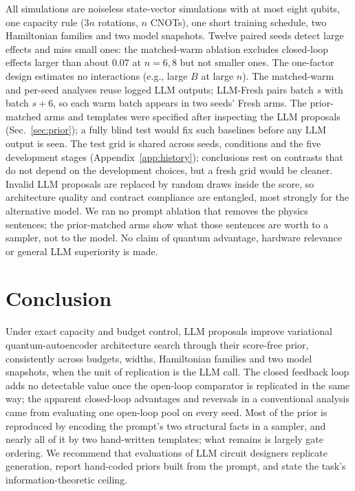 \documentclass[11pt]{article}
\begin{document}
All simulations are noiseless state-vector simulations with at most eight qubits, one
capacity rule ($3n$ rotations, $n$ CNOTs), one short training schedule, two Hamiltonian
families and two model snapshots. Twelve paired seeds detect large effects and miss
small ones: the matched-warm ablation excludes closed-loop effects larger than about
$0.07$ at $n=6,8$ but not smaller ones.
The one-factor design estimates no interactions (e.g., large $B$ at large $n$).
The matched-warm and per-seed analyses reuse logged LLM outputs; LLM-Fresh pairs batch
$s$ with batch $s+6$, so each warm batch appears in two seeds' Fresh arms.
The prior-matched arms and templates were specified after inspecting the LLM
proposals (Sec.~\ref{sec:prior}); a fully blind test would fix such baselines before
any LLM output is seen.
The test grid is shared across seeds, conditions and the five development stages
(Appendix~\ref{app:history}); conclusions rest on contrasts that do not depend on the
development choices, but a fresh grid would be cleaner.
Invalid LLM proposals are replaced by random draws inside the score, so architecture
quality and contract compliance are entangled, most strongly for the alternative model.
We ran no prompt ablation that removes the physics sentences; the prior-matched arms
show what those sentences are worth to a sampler, not to the model.
No claim of quantum advantage, hardware relevance or general LLM superiority is made.

\section{Conclusion}

Under exact capacity and budget control, LLM proposals improve variational
quantum-autoencoder architecture search through their score-free prior, consistently
across budgets, widths, Hamiltonian families and two model snapshots, when the unit of
replication is the LLM call. The closed feedback loop adds no detectable value once the
open-loop comparator is replicated in the same way; the apparent closed-loop advantages
and reversals in a conventional analysis came from evaluating one open-loop pool on
every seed. Most of the prior is reproduced by encoding the prompt's two structural
facts in a sampler, and nearly all of it by two hand-written templates; what remains is
largely gate ordering. We recommend that evaluations of LLM circuit designers replicate
generation, report hand-coded priors built from the prompt, and state the task's
information-theoretic ceiling.
\end{document}
